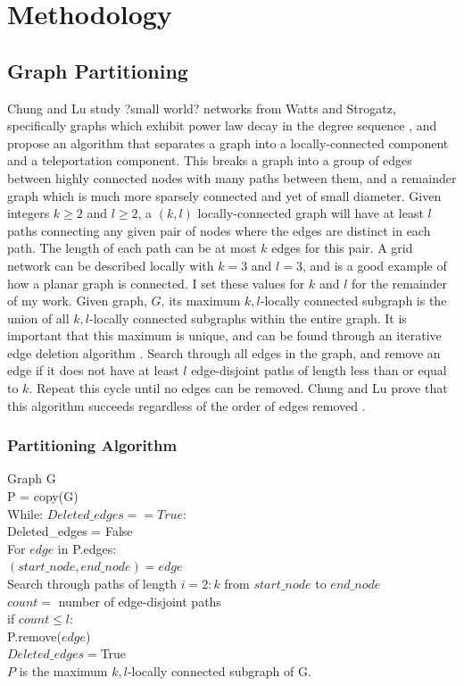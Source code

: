 \documentclass{article}
\begin{document}
\chapter{Methodology}
\section{Graph Partitioning}
Chung and Lu study ?small world? networks from Watts and Strogatz, specifically graphs which exhibit power law decay in the degree sequence \cite{Watts:1998}, and propose an algorithm that separates a graph into a locally-connected component and a teleportation component. This breaks a graph into a group of edges between highly connected nodes with many paths between them, and a remainder graph which is much more sparsely
connected and yet of small diameter. Given integers $k \geq 2$ and $l \geq 2$, a $(k,l)$ locally-connected graph will have at least $l$ paths connecting any given pair of nodes where the edges are distinct in each path. The length of each path can be at most $k$ edges for this pair. A grid network can be described locally with $k=3$ and $l=3$, and is a good example of how a planar graph is connected. I set these values for $k$ and $l$ for the remainder of my work. Given graph, $G$, its maximum $k,l$-locally connected subgraph is the union of all $k,l$-locally connected subgraphs within the entire graph. It is important that this maximum is unique, and can be found through an iterative edge deletion algorithm \cite{Chung:2004}. Search through all edges in the graph, and remove an edge if it does not have at least $l$ edge-disjoint paths of length less than or equal to $k$. Repeat this cycle until no edges can be removed. Chung and Lu prove that this algorithm succeeds regardless of the order of edges removed \cite{Chung:2004}.

\subsection{Partitioning Algorithm}
\begin{spacing}{1}
Graph G\\
P = copy(G)\\
While: $Deleted\_edges == True$:\\
\indent Deleted\_edges = False\\
\indent For $edge$ in P.edges:\\
\indent \indent $(start\_node, end\_node) = edge$\\
\indent \indent Search through paths of length $i=2:k$ from $start\_node$ to $end\_node$\\
\indent \indent $count =$  number of edge-disjoint paths\\
\indent \indent if $count \leq l$:\\
\indent \indent \indent P.remove($edge$)\\
\indent \indent \indent $Deleted\_edges = $True\\
$P$ is the maximum $k,l$-locally connected subgraph of G.
\end{spacing}	
\end{document}
